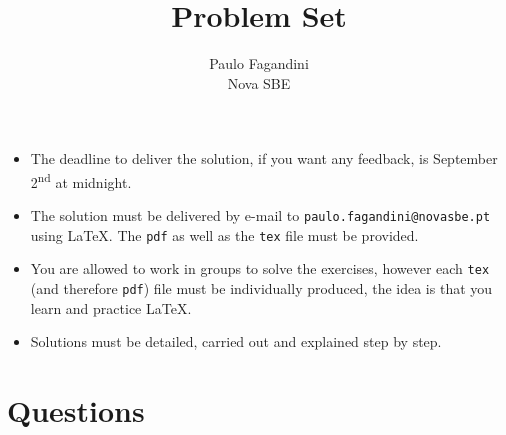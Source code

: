 \documentclass[a4paper,answers]{exam}
\title{Problem Set}
\author{Paulo Fagandini\\ Nova SBE}
\date{}
\begin{document}
\maketitle
\thispagestyle{headandfoot}

\begin{itemize}
	\item The deadline to deliver the solution, if you want any feedback, is September 2\textsuperscript{nd} at midnight.
	\item The solution must be delivered by e-mail to \texttt{paulo.fagandini@novasbe.pt} using \LaTeX. The \texttt{pdf} as well as the \texttt{tex} file must be provided.
	\item You are allowed to work in groups to solve the exercises, however each \texttt{tex} (and therefore \texttt{pdf}) file must be individually produced, the idea is that you learn and practice \LaTeX.
	\item Solutions must be detailed, carried out and explained step by step.
\end{itemize}

\section*{Questions}
\end{document}
